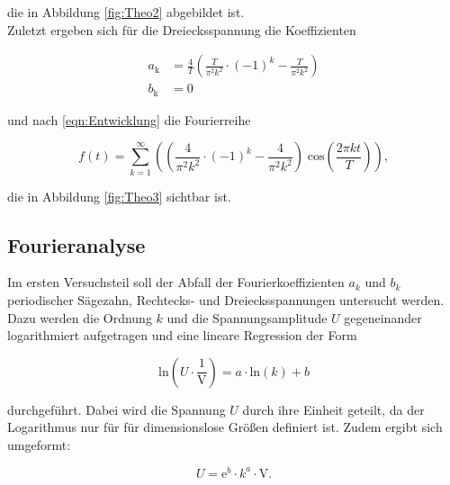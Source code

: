 die in Abbildung \ref{fig:Theo2} abgebildet ist. \\

Zuletzt ergeben sich für die Dreiecksspannung die Koeffizienten

\begin{align*}
    a_\text{k} &= \frac{4}{T} \left(\frac{T}{\pi^2 k^2} \cdot (-1)^k - \frac{T}{\pi^2 k^2} \right) \\
    b_\text{k} &= 0
\end{align*}

und nach \eqref{eqn:Entwicklung} die Fourierreihe

\begin{equation*}
    f(t) = \sum^\infty_{k = 1} \left( \left(\frac{4}{\pi^2 k^2} \cdot (-1)^k - 
    \frac{4}{\pi^2 k^2} \right) \;  \text{cos}\left(\frac{2 \pi k t}{T} \right) \right)   ,
\end{equation*} 

die in Abbildung \ref{fig:Theo3} sichtbar ist. \\













\subsection{Fourieranalyse}

Im ersten Versuchsteil soll der Abfall der Fourierkoeffizienten $a_k$ und $b_k$
periodischer Sägezahn, Rechtecks- und Dreiecksspannungen untersucht werden.
Dazu werden die Ordnung $k$ und die Spannungsamplitude $U$ gegeneinander
logarithmiert aufgetragen und eine lineare Regression der Form

\begin{equation}
    \text{ln} \left(U \cdot \frac{1}{\si{\volt}} \right) = a \cdot \text{ln}(k) + b
\end{equation}

durchgeführt.
Dabei wird die Spannung $U$ durch ihre Einheit geteilt, da der Logarithmus nur für
für dimensionslose Größen definiert ist. Zudem ergibt sich umgeformt:

\begin{equation}
    U = \text{e}^b \cdot k^a \cdot \si{\volt}.
    \label{eqn:Spannung}
\end{equation}


